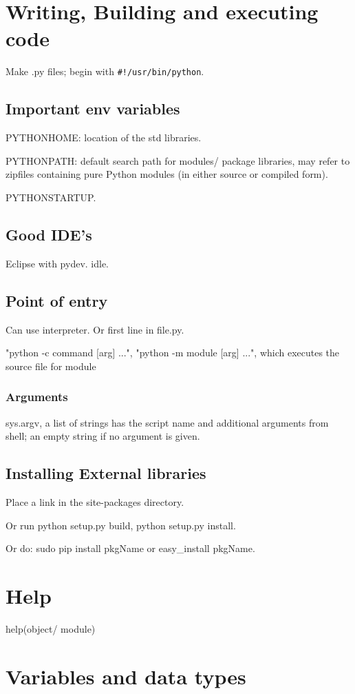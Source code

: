 \documentclass[oneside, article]{memoir}
\begin{document}
\section{Writing, Building and executing code}
Make .py files; begin with \verb'#!/usr/bin/python'.

\subsection{Important env variables}
PYTHONHOME: location of the std libraries.

PYTHONPATH: default search path for modules/ package libraries, may refer to zipfiles containing pure Python modules (in either source or compiled form).

PYTHONSTARTUP.

\subsection{Good IDE's}
Eclipse with pydev. idle.

\subsection{Point of entry}
Can use interpreter. Or first line in file.py.

"python -c command [arg] ...", "python -m module [arg] ...", which executes the source file for module

\subsubsection{Arguments}
sys.argv, a list of strings has the script name and additional arguments from shell; an empty string if no argument is given.

\subsection{Installing External libraries}
Place a link in the site-packages directory.

Or run python setup.py build, python setup.py install.

Or do: sudo pip install pkgName or easy\_install pkgName.

\section{Help}
help(object/ module)

\section{Variables and data types}
\end{document}
